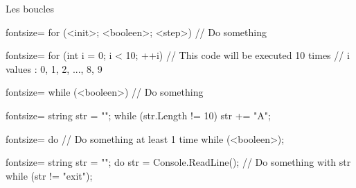 \begin{frame}
  \begin{center}
    \vspace{1cm}
    {\Large Les boucles}
  \end{center}
\end{frame}

\begin{frame}[fragile]

  \begin{csharpcode*}{fontsize=\normalsize}
    for (<init>; <booleen>; <step>)
    {
      // Do something
    }
  \end{csharpcode*}
\end{frame}

\begin{frame}[fragile]

  \begin{csharpcode*}{fontsize=\normalsize}
    for (int i = 0; i < 10; ++i)
    {
      // This code will be executed 10 times
      // i values : 0, 1, 2, ..., 8, 9
    }
  \end{csharpcode*}
\end{frame}

\begin{frame}[fragile]

  \begin{csharpcode*}{fontsize=\normalsize}
    while (<booleen>)
    {
      // Do something
    }
  \end{csharpcode*}
\end{frame}

\begin{frame}[fragile]

  \begin{csharpcode*}{fontsize=\normalsize}
    string str = "";
    while (str.Length != 10)
    {
      str += "A";
    }
  \end{csharpcode*}
\end{frame}

\begin{frame}[fragile]
  \begin{csharpcode*}{fontsize=\normalsize}
    do
    {
      // Do something at least 1 time
    } while (<booleen>);
  \end{csharpcode*}
\end{frame}

\begin{frame}[fragile]
  \begin{csharpcode*}{fontsize=\normalsize}
    string str = "";
    do
    {
      str = Console.ReadLine();
      // Do something with str
    } while (str != "exit");
  \end{csharpcode*}
\end{frame}

